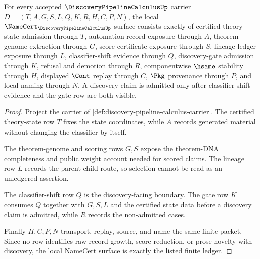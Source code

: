 \begin{theorem}
\label{thm:discovery-pipeline-calculus-namecert-obligations}
For every accepted $\DiscoveryPipelineCalculusUp$ carrier $D=(T,A,G,S,L,Q,K,R,H,C,P,N)$, the local $\NameCert_{\DiscoveryPipelineCalculusUp}$ surface consists exactly of certified theory-state admission through $T$, automation-record exposure through $A$, theorem-genome extraction through $G$, score-certificate exposure through $S$, lineage-ledger exposure through $L$, classifier-shift evidence through $Q$, discovery-gate admission through $K$, refusal and demotion through $R$, componentwise $\hsame$ stability through $H$, displayed $\Cont$ replay through $C$, $\Pkg$ provenance through $P$, and local naming through $N$. A discovery claim is admitted only after classifier-shift evidence and the gate row are both visible.
\end{theorem}
\begin{proof}
Project the carrier of \autoref{def:discovery-pipeline-calculus-carrier}. The certified theory-state row $T$ fixes the state coordinates, while $A$ records generated material without changing the classifier by itself.

The theorem-genome and scoring rows $G,S$ expose the theorem-DNA completeness and public weight account needed for scored claims. The lineage row $L$ records the parent-child route, so selection cannot be read as an unledgered assertion.

The classifier-shift row $Q$ is the discovery-facing boundary. The gate row $K$ consumes $Q$ together with $G,S,L$ and the certified state data before a discovery claim is admitted, while $R$ records the non-admitted cases.

Finally $H,C,P,N$ transport, replay, source, and name the same finite packet. Since no row identifies raw record growth, score reduction, or prose novelty with discovery, the local NameCert surface is exactly the listed finite ledger.
\end{proof}

